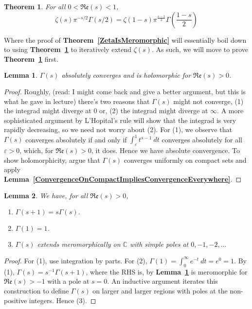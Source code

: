 \documentclass[12pt]{article}
\newcommand{\complex}{\mathbb{C}}
\newcommand{\lref}[1]{\textbf{Lemma~\ref{#1}}}
\newcommand{\tref}[1]{\textbf{Theorem~\ref{#1}}}
\newtheorem{thm}{Theorem}
\newtheorem{lemma}{Lemma}
\numberwithin{equation}{section}
\numberwithin{thm}{section}
\numberwithin{lemma}{section}
\numberwithin{cor}{section}
\begin{document}
\begin{thm}\label{ZetaFunctionalEquation}
  For all $0 < \mathfrak{Re}(s) < 1$, \begin{equation*}
    \zeta(s) \pi^{-s/2} \Gamma(s/2) = \zeta(1 - s) \pi^{\frac{s-1}{2}}\Gamma \left( \frac{1-s}{2} \right)
  \end{equation*}
\end{thm}

Where the proof of \tref{ZetaIsMeromorphic} will essentially boil down to using \tref{ZetaFunctionalEquation} to iteratively extend $\zeta(s)$. As such, we will move to prove \tref{ZetaFunctionalEquation} first.

\begin{lemma}\label{ConvergenceOfGamma}
  $\Gamma(s)$ absolutely converges and is holomorphic for $\mathfrak{Re}(s) > 0$.
\end{lemma}
\begin{proof}
  Roughly, (read: I might come back and give a better argument, but this is what he gave in lecture) there's two reasons that $\Gamma(s)$ might not converge, (1) the integrad might diverge at $0$ or, (2) the integrad might diverge at $\infty$. A more sophisticated argument by L'Hopital's rule will show that the integrad is very rapidly decreasing, so we need not worry about (2). For (1), we observe that $\Gamma(s)$ converges absolutely if and only if $\int_{\varepsilon}^1 t^{s-1} \ dt$ converges absolutely for all $\varepsilon > 0$, which, for $\mathfrak{Re}(s) > 0$, it does. Hence we have absolute convergence. To show holomorphicity, argue that $\Gamma(s)$ converges uniformly on compact sets and apply \lref{ConvergenceOnCompactImpliesConvergenceEverywhere}.
\end{proof}

\begin{lemma}\label{GammaProperties}
  We have, for all $\mathfrak{Re}(s) > 0$, \begin{enumerate}
    \item $\Gamma(s + 1) = s \Gamma(s)$.
    \item $\Gamma(1) = 1$.
    \item $\Gamma(s)$ extends meromorphically on $\complex$ with simple poles at $0, -1, -2, ...$
  \end{enumerate}
\end{lemma}
\begin{proof}
  For (1), use integration by parts. For (2), $\Gamma(1) = \int_0^{\infty} e^{-t} \ dt = e^0 = 1$. By (1), $\Gamma(s) = s^{-1} \Gamma(s + 1)$, where the RHS is, by \lref{ConvergenceOfGamma} is meromorphic for $\mathfrak{Re}(s) > -1$ with a pole at $s = 0$. An inductive argument iterates this construction to define $\Gamma(s)$ on larger and larger regions with poles at the non-positive integers. Hence (3).
\end{proof}
\end{document}
